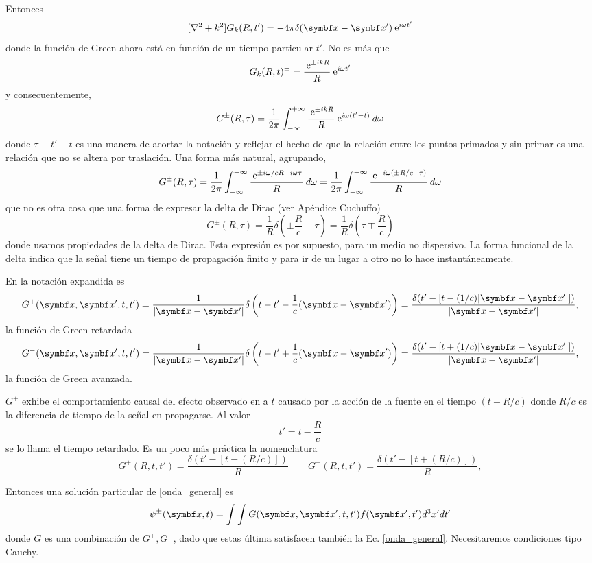 \documentclass[10pt,oneside]{CBFT_book}
\begin{document}
Entonces
\[
	[\nabla^2 + k^2] G_k(R,t') = - 4 \pi \delta(\vbx - \vbx') \euler^{i \omega t'}
\]
donde la función de Green ahora está en función de un tiempo particular $t'$. No es más que
\[
	G_k(R,t)^{\pm} = \frac{\:\mathrm{e}^{\pm i k R} }{ R }\:\mathrm{e}^{i \omega t'}
\]
y consecuentemente,
\[
	G^{\pm}(R,\tau) = \frac{1}{2\pi} \int_{-\infty}^{+\infty} 
	 \frac{\:\mathrm{e}^{\pm i k R} }{ R }\:\mathrm{e}^{i \omega (t'-t)} \: d\omega
\]
donde $\tau \equiv t'-t$ es una manera de acortar la notación y reflejar el hecho de que la relación
entre los puntos primados y sin primar es una relación que no se altera por traslación.
Una forma más natural, agrupando,
\[
	G^{\pm}(R,\tau) = \frac{1}{2\pi} \int_{-\infty}^{+\infty} 
	 \frac{ \:\mathrm{e}^{ \pm i \omega/c R - i \omega \tau } }{ R } \: d\omega =
	\frac{1}{2\pi} \int_{-\infty}^{+\infty} 
	 \frac{ \:\mathrm{e}^{ - i \omega( \pm R/c - \tau )} }{ R } \: d\omega
\]
que no es otra cosa que una forma de expresar la delta de Dirac (ver Apéndice Cuchuffo)
\[
	G^{\pm}(R,\tau) = \frac{1}{R} \delta\left( \pm \frac{R}{c} - \tau \right) =
	\frac{1}{R} \delta\left( \tau \mp \frac{R}{c} \right)
\]
donde usamos propiedades de la delta de Dirac. Esta expresión es por supuesto, para
un medio no dispersivo.
La forma funcional de la delta indica que la señal tiene un tiempo de propagación finito y
para ir de un lugar a otro no lo hace instantáneamente.

En la notación expandida es
\[
	G^+(\vb{x},\vb{x}',t,t') = 
	\frac{1}{|\vb{x} - \vb{x}'|} \delta\left( t-t' - \frac{1}{c}(\vb{x} - \vb{x}')\right) 
	= \frac{ \delta(t' - [t-(1/c)|\vb{x} - \vb{x}'|]) }{|\vb{x} - \vb{x}'|} ,
\]
la función de Green retardada
\[
	G^-(\vb{x},\vb{x}',t,t') = 
	\frac{1}{|\vb{x} - \vb{x}'|} \delta\left( t-t' + \frac{1}{c}(\vb{x} - \vb{x}')\right) 
	= \frac{ \delta(t' - [t + (1/c)|\vb{x} - \vb{x}'|]) }{|\vb{x} - \vb{x}'|},
\]
la función de Green avanzada.

$G^+$ exhibe el comportamiento causal del efecto observado en  a $t$ causado por la acción de la
fuente en el tiempo $(t-R/c)$ donde $R/c$ es la diferencia de tiempo de la señal en propagarse.
Al valor 
\[
	t' = t - \frac{R}{c}
\]
se lo llama el tiempo retardado. Es un poco más práctica la nomenclatura
\[
	G^+(R,t,t') = \frac{ \delta(t' - [ t - (R/c) ]) }{ R } 
	\qquad 
	G^-(R,t,t') = \frac{ \delta(t' - [ t + (R/c) ]) }{ R } ,
\]

Entonces una solución particular de \eqref{onda_general} es 
\[
	\psi^\pm (\vb{x},t) = \int \int G(\vb{x},\vb{x}',t,t') f(\vb{x}',t') d^3x' dt' 
\]
donde $G$ es una combinación de $G^+, G^-$, dado que estas última satisfacen también la
Ec. \eqref{onda_general}.
Necesitaremos condiciones tipo Cauchy.
\end{document}
